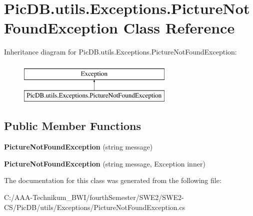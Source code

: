 \hypertarget{class_pic_d_b_1_1utils_1_1_exceptions_1_1_picture_not_found_exception}{}\section{Pic\+D\+B.\+utils.\+Exceptions.\+Picture\+Not\+Found\+Exception Class Reference}
\label{class_pic_d_b_1_1utils_1_1_exceptions_1_1_picture_not_found_exception}
Inheritance diagram for Pic\+D\+B.\+utils.\+Exceptions.\+Picture\+Not\+Found\+Exception\+:\begin{figure}[H]
\begin{center}
\leavevmode
\includegraphics[height=2.000000cm]{class_pic_d_b_1_1utils_1_1_exceptions_1_1_picture_not_found_exception}
\end{center}
\end{figure}
\subsection*{Public Member Functions}
\begin{DoxyCompactItemize}
\item 
\mbox{\label{class_pic_d_b_1_1utils_1_1_exceptions_1_1_picture_not_found_exception_a47ea61a22aa4771f0d5352e6f294fc4e}} 
{\bfseries Picture\+Not\+Found\+Exception} (string message)
\item 
\mbox{\label{class_pic_d_b_1_1utils_1_1_exceptions_1_1_picture_not_found_exception_a344dc575a29ba98c38fced7ddc9190d2}} 
{\bfseries Picture\+Not\+Found\+Exception} (string message, Exception inner)
\end{DoxyCompactItemize}


The documentation for this class was generated from the following file\+:\begin{DoxyCompactItemize}
\item 
C\+:/\+A\+A\+A-\/\+Technikum\+\_\+\+B\+W\+I/fourth\+Semester/\+S\+W\+E2/\+S\+W\+E2-\/\+C\+S/\+Pic\+D\+B/utils/\+Exceptions/Picture\+Not\+Found\+Exception.\+cs\end{DoxyCompactItemize}
